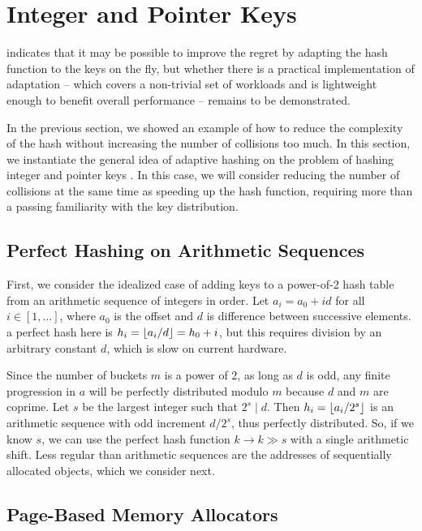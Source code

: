 \documentclass[sigconf]{acmart}
\DeclarePairedDelimiter{\floor}{\lfloor}{\rfloor}
\renewcommand{\label}[1]{%
    \gdef\sfname{sf:##1}}%
\begin{document}
\section{Integer and Pointer Keys}
\label{sec:pointer-keys}

 indicates that it may be possible to improve the regret by adapting the hash function to the keys on the fly, but whether there is a practical implementation of adaptation -- which covers a non-trivial set of workloads and is lightweight enough to benefit overall performance -- remains to be demonstrated.

In the previous section, we showed an example of how to reduce the complexity of the hash without increasing the number of collisions too much.
In this section, we instantiate the general idea of adaptive hashing on the problem of hashing integer and pointer keys \citep{integerhashing}.
In this case, we will consider reducing the number of collisions at the same time as speeding up the hash function, requiring more than a passing familiarity with the key distribution.

\subsection{Perfect Hashing on Arithmetic Sequences}
\label{sec:arithmetic-sequences}

First, we consider the idealized case of adding keys to a power-of-2 hash table from an arithmetic sequence of integers in order.
Let $a_i = a_0 + id$ for all $i \in [1, \dots]$, where $a_0$ is the offset and $d$ is difference between successive elements.
a perfect hash here is $h_i = \floor{a_i/d} = h_0 + i$, but this requires division by an arbitrary constant $d$, which is slow on current hardware.

Since the number of buckets $m$ is a power of 2, as long as $d$ is odd, any finite progression in $a$ will be perfectly distributed modulo $m$ because $d$ and $m$ are coprime.
Let $s$ be the largest integer such that $2^s \mid d$.
Then $h_i = \floor{a_i / 2^s}$ is an arithmetic sequence with odd increment $d / 2^s$, thus perfectly distributed.
So, if we know $s$, we can use the perfect hash function $k \rightarrow k \gg s$ with a single arithmetic shift.
Less regular than arithmetic sequences are the addresses of sequentially allocated objects, which we consider next.

\subsection{Page-Based Memory Allocators}
\label{sec:allocators}
\end{document}
